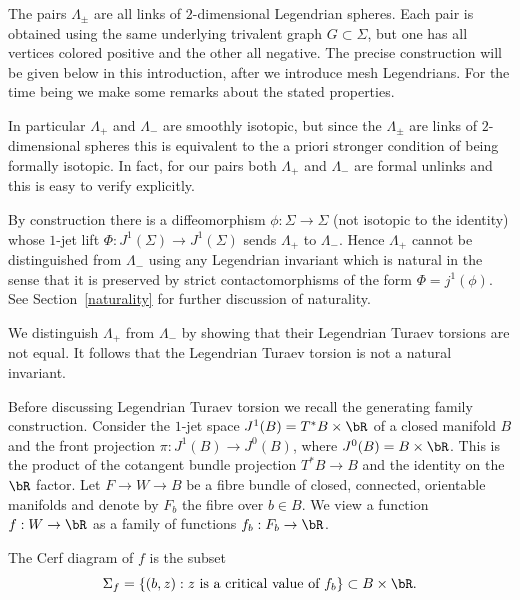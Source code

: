 \begin{remark} The pairs $\Lambda_\pm$ are all links of $2$-dimensional Legendrian spheres. Each pair is obtained using the same underlying trivalent graph $G \subset \Sigma$, but one has all vertices colored positive and the other all negative. The precise construction will be given below in this introduction, after we introduce mesh Legendrians. For the time being we make some remarks about the stated properties.\begin{enumeratea}
\item
In particular $\Lambda_+$ and $\Lambda_-$ are smoothly isotopic, but since the $\Lambda_{\pm}$ are links of $2$-dimensional spheres this is equivalent to the a priori stronger condition of being formally isotopic. In fact, for our pairs both $\Lambda_+$ and $\Lambda_-$ are formal unlinks and this is easy to verify explicitly.
\item
By construction there is a diffeomorphism $\phi: \Sigma \to \Sigma$ (not isotopic to the identity) whose $1$-jet lift $\Phi:J^1(\Sigma) \to J^1(\Sigma)$ sends $\Lambda_+$ to $\Lambda_-$. Hence $\Lambda_+$ cannot be distinguished from $\Lambda_-$ using any Legendrian invariant which is natural in the sense that it is preserved by strict contactomorphisms of the form $\Phi=j^1(\phi)$. See Section~\ref{naturality} for further discussion of naturality.
\item
We distinguish $\Lambda_+$ from $\Lambda_-$ by showing that their Legendrian Turaev torsions are not equal. It follows that the Legendrian Turaev torsion is not a natural invariant.
\end{enumeratea}
\end{remark}

Before discussing Legendrian Turaev torsion we recall the generating family construction. Consider the $1$-jet space $J^1(B)=T^*B \times \bR$ of a closed manifold $B$ and the front projection $\pi: J^1(B) \to J^0(B)$, where $J^0(B)=B \times \bR$. This is the product of the cotangent bundle projection $T^*B \to B$ and the identity on the $\bR$ factor. Let $F \to W \to B$ be a fibre bundle of closed, connected, orientable manifolds and denote by $F_b$ the fibre over $b \in B$. We view a function $f:W \to \bR$ as a family of functions $f_b:F_b \to \bR$.

\begin{definition} The Cerf diagram of $f$ is the subset
\[
\Sigma_f=\{ (b,z) : \text{$z$ is a critical value of $f_b$} \} \subset B \times \bR.
\]
\end{definition}


